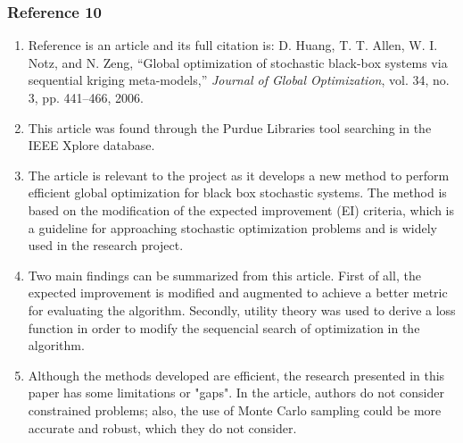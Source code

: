 \documentclass{journal}
\begin{document}
\subsubsection{Reference 10}
\begin{enumerate}
	\item Reference \cite{Huang2006} is an article and its full citation is:  D. Huang, T. T. Allen, W. I. Notz, and N. Zeng, “Global optimization of stochastic black-box systems via sequential kriging meta-models,” \textit{Journal of Global Optimization}, vol. 34, no. 3, pp. 441–466, 2006.
	\item This article was found through the Purdue Libraries tool searching in the IEEE Xplore database.
	\item The article is relevant to the project as it develops a new method to perform efficient global optimization for black box stochastic systems. The method is based on the modification of the expected improvement (EI) criteria, which is a guideline for approaching stochastic optimization problems and is widely used in the research project.
	\item Two main findings can be summarized from this article. First of all, the expected improvement is modified and augmented to achieve a better metric for evaluating the algorithm. Secondly, utility theory was used to derive a loss function in order to modify the sequencial search of optimization in the algorithm.
	\item Although the methods developed are efficient, the research presented in this paper has some limitations or "gaps". In the article, authors do not consider constrained problems; also, the use of Monte Carlo sampling could be more accurate and robust, which they do not consider.
\end{enumerate}
\end{document}
